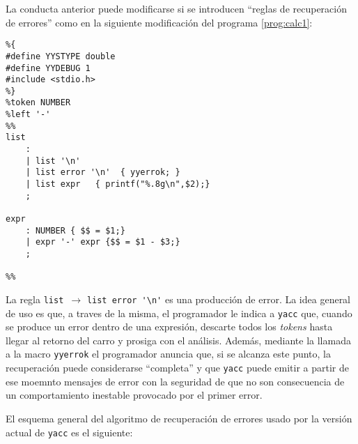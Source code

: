 \begin{program}
\label{prog:calc1err}
La conducta anterior puede modificarse si se introducen ``reglas de 
recuperación de errores'' como en la siguiente modificación
del programa \ref{prog:calc1}:
\begin{verbatim}
%{
#define YYSTYPE double
#define YYDEBUG 1
#include <stdio.h>
%}
%token NUMBER
%left '-'
%%
list 
    :
    | list '\n'  
    | list error '\n'  { yyerrok; }
    | list expr   { printf("%.8g\n",$2);}
    ;

expr 
    : NUMBER { $$ = $1;} 
    | expr '-' expr {$$ = $1 - $3;}
    ;

%%
\end{verbatim}
\end{program}
La regla \verb|list |$\rightarrow$ \verb|list error '\n'| es una producción de
error. La idea general de uso es que, a traves de la misma, el programador 
le indica a \verb|yacc| que, cuando se produce un error
dentro de una expresión, descarte todos los \emph{tokens} hasta llegar al
retorno del carro y prosiga con el análisis. 
Además, mediante la llamada a  la macro \verb|yyerrok| el programador
anuncia que, si se alcanza este punto, la recuperación puede considerarse ``completa''  y que 
\verb|yacc| puede emitir a partir de ese moemnto mensajes de error
con la seguridad de que no son consecuencia de un comportamiento inestable
provocado por el primer error.

\begin{algorithm}
\label{alg:errorrecovery1}
El esquema general del algoritmo de recuperación de errores usado 
por la versión actual de \verb|yacc| es el siguiente:

\end{algorithm}

